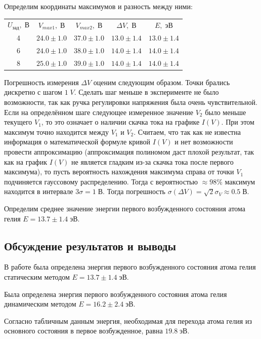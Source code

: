 \documentclass[10pt,a4paper]{article}
\newcommand{\V}{\; В}
\begin{document}
	Определим координаты максимумов и разность между ними: \\
	\begin{tabular}{|c|c|c|c|c|}
		$U_{зад}, \V$ & $V_{max1}, \V$ & $V_{max2}, \V$ & $\Delta V, \V$ & $E, \; эВ$ \\
		4 & $24.0 \pm 1.0$ & $37.0 \pm 1.0$ & $13.0 \pm 1.4$ & $13.0 \pm 1.4$ \\
		6 & $24.0 \pm 1.0$ & $38.0 \pm 1.0$ & $14.0 \pm 1.4$ & $14.0 \pm 1.4$ \\
		8 & $25.0 \pm 1.0$ & $39.0 \pm 1.0$ & $14.0 \pm 1.4$ & $14.0 \pm 1.4$ \\
	\end{tabular}
	
	Погрешность измерения $\Delta V$ оценим следующим образом. Точки брались дискретно с шагом $1 \; V$. Сделать шаг меньше в эксперименте не было возможности, так как ручка регулировки напряжения была очень чувствительной. Если на определённом шаге следующее измеренное значение $V_2$ было меньше текущего $V_1$, то это означает о наличии скачка тока на графике $I(V)$. При этом максимум точно находится между $V_1$ и $V_2$. Считаем, что так как не известна информация о математической формуле кривой $I(V)$ и нет возможности провести аппроксимацию (аппроксимация полиномом даст плохой результат, так как на график $I(V)$ не является гладким из-за скачка тока после первого максимума), то пусть вероятность нахождения максимума справа от точки $V_1$ подчиняется гауссовому распределению. Тогда с вероятностью $\approx 98 \%$ максимум находится в интервале $3\sigma = 1 \V$. Тогда погрешность $\sigma(\Delta V) = \sqrt{2} \sigma_V \approx 0.5 \V$.
	
	Определим среднее значение энергии первого возбужденного состояния атома гелия $E = 13.7 \pm 1.4 \; эВ$.
	
	\subsection*{Обсуждение результатов и выводы}
	
	В работе была определена энергия первого возбужденного состояния атома гелия статическим методом $E = 13.7 \pm 1.4 \; эВ$.
	
	Была определена энергия первого возбужденного состояния атома гелия динамическим методом $E = 16.2 \pm 2.4 \; эВ$.
	
	Согласно табличным данным энергия, необходимая для перехода атома гелия из основного состояния в первое возбужденное, равна $19.8 \; эВ$.
	
\end{document}
